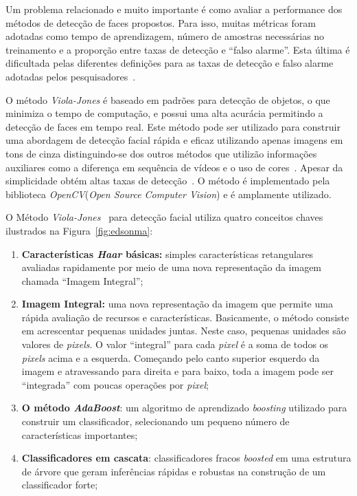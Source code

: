 	Um problema relacionado e muito importante é como avaliar a performance dos
	métodos de detecção de faces propostos. Para isso, muitas métricas foram
	adotadas como tempo de aprendizagem, número de amostras necessárias no
	treinamento e a proporção entre taxas de detecção e ``falso alarme''. Esta
	última é dificultada pelas diferentes definições para as taxas de detecção e
	falso alarme adotadas pelos pesquisadores~\cite{yang}.
	
	O método \textit{Viola-Jones} é baseado em padrões para detecção de objetos, o
	que minimiza o tempo de computação, e possui uma alta acurácia permitindo a
	detecção de faces em tempo real. Este método pode ser utilizado para construir
	uma abordagem de detecção facial rápida e eficaz utilizando apenas imagens em
	tons de cinza distinguindo-se dos outros métodos que utilizão informações
	auxiliares como a diferença em sequência de vídeos e o uso de
	cores~\cite{edsonma, violajones}. Apesar da simplicidade obtém altas taxas de
	detecção~\cite{edsonma}. O método é implementado pela biblioteca
	\textit{OpenCV}(\textit{Open Source Computer Vision}) e é amplamente utilizado.
	
	O Método \textit{Viola-Jones}~\cite{servodetection,violajones,edsonma} para detecção facial utiliza quatro conceitos
	chaves ilustrados na Figura~\ref{fig:edsonma}:
		
	\begin{enumerate}
		\item \textbf{Características \textit{Haar} básicas:} simples características
		retangulares avaliadas rapidamente por meio de uma nova representação da imagem
		chamada ``Imagem Integral'';
		
		\item \textbf{Imagem Integral:} uma nova representação da imagem que permite uma
		rápida avaliação de recursos e características. Basicamente, o método consiste
		em acrescentar pequenas unidades juntas. Neste caso, pequenas unidades são
		valores de \textit{pixels}. O valor ``integral'' para cada \textit{pixel} é a
		soma de todos os \textit{pixels} acima e a esquerda. Começando pelo canto
		superior esquerdo da imagem e atravessando para direita e para baixo, toda a
		imagem pode ser ``integrada'' com poucas operações por
		\textit{pixel};
		
		\item \textbf{O método \textit{AdaBoost}}: um algoritmo de aprendizado
		\textit{boosting} utilizado para construir um classificador, selecionando um
		pequeno número de características importantes;
		
		\item \textbf{Classificadores em cascata}: classificadores fracos
		\textit{boosted} em uma estrutura de árvore que geram inferências rápidas e
		robustas na construção de um classificador
		forte;
	\end{enumerate}

